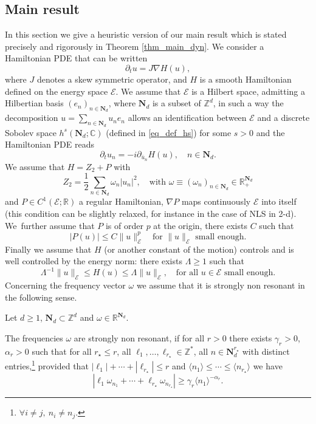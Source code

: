 \subsection{Main result}
In this section we give a heuristic version of our main result which is stated precisely and rigorously in Theorem \ref{thm_main_dyn}.
We consider a Hamiltonian PDE that can be written
\[
\partial_t u=J\nabla H(u),
\]
where $J$ denotes a skew symmetric operator, and $H$ is a smooth Hamiltonian defined on the energy space $\mathcal E$. We assume that $\mathcal E$ is a Hilbert space, admitting a Hilbertian basis $(e_n)_{n\in \mathbf{N}_d}$, where $\mathbf{N}_d$ is a subset of $\mathbb{Z}^d$, in such a way the decomposition $u=\sum_{n\in \mathbf{N}_d}u_ne_n $ allows an identification between $\mathcal E$ and a discrete Sobolev space $h^s(\mathbf{N}_d;\mathbb{C})$ (defined in \eqref{eq_def_hs}) for some $s>0$ and the Hamiltonian PDE reads
\[
\partial_t u_n =-i \partial_{\bar u_n}H(u),\quad n\in \mathbf{N}_d.
\]
We assume that $H=Z_2+P$ with
\[
Z_2=\frac12\sum_{n\in\mathbf{N}_d}\omega_n |u_n|^2,\quad \text{with }\omega\equiv(\omega_n)_{n\in\mathbf{N}_d }\in \mathbb{R}_{+}^{\mathbf{N}_d}
\]
and $P\in C^1(\mathcal E;\mathbb{R})$ a regular Hamiltonian, \ie $\nabla P$ maps continuously $\mathcal E$ into itself (this condition can be slightly relaxed, for instance in the case of NLS in 2-d). We~further assume that $P$ is of order $p$ at the origin, \ie there exists $C$ such that
\begin{equation}\label{P}|P(u)|\leq C\| u\|_{\mathcal{E}}^p\quad \text{for } \|u\|_{\mathcal{E}} \text{ small enough.} \end{equation} Finally we assume that $H$ (or another constant of the motion) controls and is well controlled by the energy norm: there exists $\Lambda \geq 1$ such that
\begin{equation}\label{Lambda}\Lambda^{-1}\| u\|_{\mathcal{E}} \leq H(u)\leq \Lambda \|u\|_{\mathcal{E}},\quad \text{for all }u\in{\mathcal{E}} \text{ small enough.}\end{equation}
Concerning the frequency vector $\omega$ we assume that it is strongly non resonant in the following sense.
\begin{definition}
\label{def_SNR} Let $d\geq 1$, $\mathbf{N}_d \subset \mathbb{Z}^d$ and $\omega \in \mathbb{R}^{\mathbf{N}_d}$.

The frequencies $\omega$ are strongly non resonant, if for all $r>0$ there exists $\gamma_r>0$, $\alpha_r>0$ such that for all $r_\star \leq r$, all $\ell_1,\dots,\ell_{r_\star} \in \mathbb{Z}^*$, all $n \in \mathbf{N}_d^{r_\star}$ with distinct entries,\footnote{\ie $\forall i\neq j,\ n_i\neq n_j$.} provided that $|\ell_1|+\cdots+|\ell_{r_\star}| \leq r$ and $\langle n_1 \rangle \leq \cdots \leq \langle n_{r_\star} \rangle$ we have
\begin{equation}
\label{eq_est_NR}
|\ell_1 \omega_{n_1} + \cdots + \ell_{r_\star} \omega_{n_{r_\star}} | \geq \gamma_{r} \langle n_1 \rangle^{-\alpha_r}.
\end{equation}
\end{definition}
